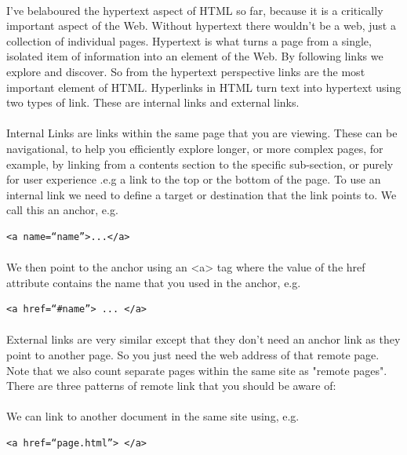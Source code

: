 \paragraph{} I've belaboured the hypertext aspect of HTML so far, because it is a critically important aspect of the Web. Without hypertext there wouldn't be a web, just a collection of individual pages. Hypertext is what turns a page from a single, isolated item of information into an element of the Web. By following links we explore and discover. So from the hypertext perspective links are the most important element of HTML. 
Hyperlinks in HTML turn text into hypertext using two types of link. These are internal links and external links. \paragraph{} Internal Links are links within the same page that you are viewing. These can be navigational, to help you efficiently explore longer, or more complex pages, for example, by linking from a contents section to the specific sub-section, or purely for user experience .e.g a link to the top or the bottom of the page. To use an internal link we need to define a target or destination that the link points to. We call this an anchor, e.g.
\begin{lstlisting}
<a name=“name”>...</a>
\end{lstlisting}
\paragraph{} We then point to the anchor using an <a> tag where the value of the href attribute contains the name that you used in the anchor, e.g.
\begin{lstlisting}	
<a href=“#name”> ... </a>
\end{lstlisting}
\paragraph{} External links are very similar except that they don't need an anchor link as they point to another page. So you just need the web address of that remote page. Note that we also count separate pages within the same site as "remote pages". There are three patterns of remote link that you should be aware of:
\paragraph{} We can link to another document in the same site using, e.g.
\begin{lstlisting}
<a href=“page.html”> </a> 
\end{lstlisting}
